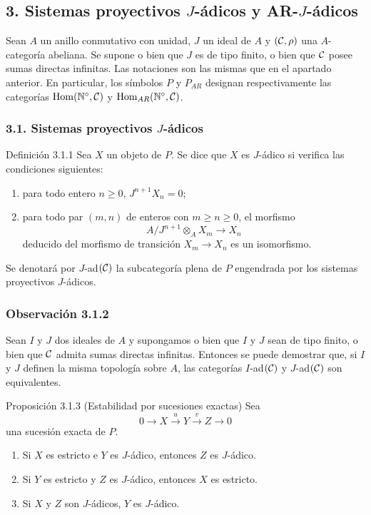 \subsection*{3. Sistemas proyectivos $J$-ádicos y AR-$J$-ádicos}
Sean $A$ un anillo conmutativo con unidad, $J$ un ideal de $A$ y $(\mathcal C,\rho)$ una $A$-categoría abeliana. Se supone o bien que $J$ es de tipo finito, o bien que $\mathcal C$ posee sumas directas infinitas. Las notaciones son las mismas que en el apartado anterior. En particular, los símbolos $P$ y $P_{AR}$ designan respectivamente las categorías $\operatorname{Hom}(\mathbb N^\circ,\mathcal C)$ y $\operatorname{Hom}_{AR}(\mathbb N^\circ,\mathcal C)$.

\subsubsection*{3.1. Sistemas proyectivos $J$-ádicos}
\begin{statement}{Definición 3.1.1}
Sea $X$ un objeto de $P$. Se dice que $X$ es $J$-ádico si verifica las condiciones siguientes:
\begin{enumerate}[label=(\roman*)]
\item para todo entero $n\ge0$, $J^{n+1}X_n=0$;
\item para todo par $(m,n)$ de enteros con $m\ge n\ge0$, el morfismo
\[
A/J^{n+1}\otimes_A X_m\longrightarrow X_n
\]
deducido del morfismo de transición $X_m\to X_n$ es un isomorfismo.
\end{enumerate}
\end{statement}
Se denotará por $J$-ad$(\mathcal C)$ la subcategoría plena de $P$ engendrada por los sistemas proyectivos $J$-ádicos.

\subsubsection*{Observación 3.1.2}
Sean $I$ y $J$ dos ideales de $A$ y supongamos o bien que $I$ y $J$ sean de tipo finito, o bien que $\mathcal C$ admita sumas directas infinitas. Entonces se puede demostrar que, si $I$ y $J$ definen la misma topología sobre $A$, las categorías $I$-ad$(\mathcal C)$ y $J$-ad$(\mathcal C)$ son equivalentes.

\begin{statement}{Proposición 3.1.3 (Estabilidad por sucesiones exactas)}
Sea
\[
0\longrightarrow X\stackrel{u}{\longrightarrow}Y\stackrel{v}{\longrightarrow}Z\longrightarrow0
\]
una sucesión exacta de $P$.
\begin{enumerate}[label=(\roman*)]
\item Si $X$ es estricto e $Y$ es $J$-ádico, entonces $Z$ es $J$-ádico.
\item Si $Y$ es estricto y $Z$ es $J$-ádico, entonces $X$ es estricto.
\item Si $X$ y $Z$ son $J$-ádicos, $Y$ es $J$-ádico.
\end{enumerate}
\end{statement}

